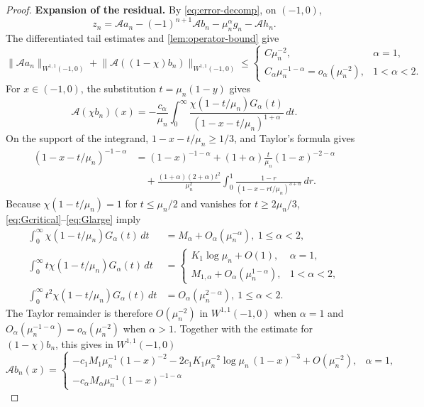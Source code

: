 \documentclass[11pt]{amsart}
\numberwithin{equation}{section}
\theoremstyle{remark}
\newcommand{\norm}[2][]{\lVert #2\rVert_{#1}}
\begin{document}
\begin{proof}

\medskip
\noindent\textbf{Expansion of the residual.}\quad
By \eqref{eq:error-decomp}, on $(-1,0)$,
\[
 z_n=\mathcal Aa_n-(-1)^{n+1}\mathcal Ab_n-\mu_n^\alpha g_n-\mathcal Ah_n.
\]
The differentiated tail estimates and \cref{lem:operator-bound} give
\[
 \norm[W^{1,1}(-1,0)]{\mathcal Aa_n}
 +\norm[W^{1,1}(-1,0)]{\mathcal A((1-\chi)b_n)}
 \le
 \begin{cases}
  C\mu_n^{-2},&\alpha=1,\\
  C_\alpha\mu_n^{-1-\alpha}=o_\alpha(\mu_n^{-2}),&1<\alpha<2.
 \end{cases}
\]
For $x\in(-1,0)$, the substitution $t=\mu_n(1-y)$ gives
\[
 \mathcal A(\chi b_n)(x)
 =-\frac{c_\alpha}{\mu_n}\int_0^\infty
 \frac{\chi(1-t/\mu_n)G_\alpha(t)}{(1-x-t/\mu_n)^{1+\alpha}}\,dt.
\]
On the support of the integrand, $1-x-t/\mu_n\ge1/3$, and Taylor's formula gives
\[
 \begin{aligned}
 (1-x-t/\mu_n)^{-1-\alpha}
 &=(1-x)^{-1-\alpha}
 +(1+\alpha)\frac{t}{\mu_n}(1-x)^{-2-\alpha}\\
 &\quad+\frac{(1+\alpha)(2+\alpha)t^2}{\mu_n^2}
 \int_0^1\frac{1-r}{(1-x-rt/\mu_n)^{3+\alpha}}\,dr.
 \end{aligned}
\]
Because $\chi(1-t/\mu_n)=1$ for $t\le\mu_n/2$ and vanishes for
$t\ge2\mu_n/3$, \eqref{eq:Gcritical}--\eqref{eq:Glarge} imply
\[
 \begin{aligned}
 \int_0^\infty\chi(1-t/\mu_n)G_\alpha(t)\,dt
 &=M_\alpha+
  O_\alpha(\mu_n^{-\alpha}),
  \ 1\le\alpha<2,\\
 \int_0^\infty t\chi(1-t/\mu_n)G_\alpha(t)\,dt
 &=
 \begin{cases}
  K_1\log\mu_n+O(1),&\alpha=1,\\
  M_{1,\alpha}+O_\alpha(\mu_n^{1-\alpha}),&1<\alpha<2,
 \end{cases}\\
 \int_0^\infty t^2\chi(1-t/\mu_n)G_\alpha(t)\,dt
 &=
  O_\alpha(\mu_n^{2-\alpha}),\ 1\le\alpha<2. 
 \end{aligned}
\]
The Taylor remainder is therefore $O(\mu_n^{-2})$ in
$W^{1,1}(-1,0)$ when $\alpha=1$ and
$O_\alpha(\mu_n^{-1-\alpha})=o_\alpha(\mu_n^{-2})$ when $\alpha>1$.
Together with the estimate for $(1-\chi)b_n$, this gives in
$W^{1,1}(-1,0)$
\[
 \mathcal Ab_n(x)=
 \begin{cases}
 -c_1M_1\mu_n^{-1}(1-x)^{-2}
 -2c_1K_1\mu_n^{-2}\log\mu_n\,(1-x)^{-3}
 +O(\mu_n^{-2}),&\alpha=1,\\[1mm]
 -c_\alpha M_\alpha\mu_n^{-1}(1-x)^{-1-\alpha}

\end{cases}\]
\end{proof}
\end{document}
